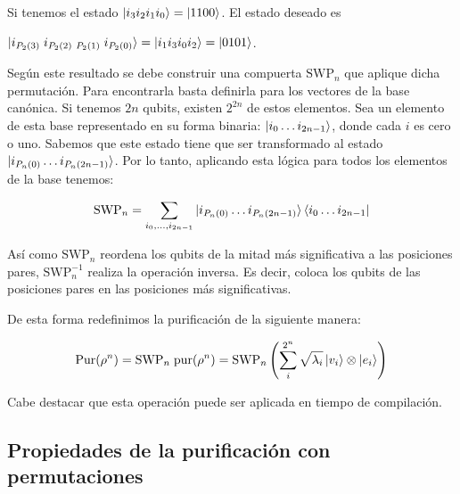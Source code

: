 \begin{ejemplo}
    Si tenemos el estado $\ket{i_3 i_2 i_1 i_0}=\ket{1100}$. El estado deseado es
    
    $\ket{i_{P_2(3)}\;i_{P_2(2)} \;_{P_2(1)}\;i_{P_2(0)} } = \ket{i_1 i_3 i_0 i_2} = \ket{0101}$.
\end{ejemplo}
Según este resultado se debe construir una compuerta $\text{SWP}_n$ que aplique dicha permutación. Para encontrarla basta definirla para los vectores de la base canónica. Si tenemos $2n$ qubits, existen $2^{2n}$ de estos elementos. Sea un elemento de esta base representado en su forma binaria: $\ket{i_0 \dots i_{2n-1}}$, donde cada $i$ es cero o uno. Sabemos que este estado tiene que ser transformado al estado $\ket{i_{P_n(0)} \dots i_{P_n(2n-1)}}$. Por lo tanto, aplicando esta lógica para todos los elementos de la base tenemos:

\begin{equation}
    \text{SWP}_n = \sum_{i_0,\dots,i_{2n-1}} \ket{i_{P_n(0)} \dots i_{P_n(2n-1)}} \bra{i_0 \dots i_{2n-1}} 
\end{equation}

\begin{observacion}
    Así como $\text{SWP}_n$ reordena los qubits de la mitad más significativa a las posiciones pares, $\text{SWP}_n^{-1}$ realiza la operación inversa. Es decir, coloca los qubits de las posiciones pares en las posiciones más significativas.
\end{observacion}

De esta forma redefinimos la purificación de la siguiente manera:

\begin{definicion}[$\Pur$]\label{def:Pur}
\begin{equation*}
    \text{Pur}(\rho^n) = \text{SWP}_n\; \text{pur}(\rho^n) = \text{SWP}_n \left(\sum_i^{2^n} \sqrt{\lambda_i}\ket{v_i}\otimes\ket{e_i}\right)
\end{equation*}
\end{definicion}

\begin{observacion}
Cabe destacar que esta operación puede ser aplicada en tiempo de compilación.
\end{observacion}

\subsection{Propiedades de la purificación con permutaciones}

